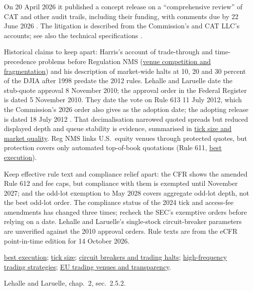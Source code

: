 \begin{qfrule}
On 20 April 2026 it published a concept release on a ``comprehensive review'' of CAT and other audit trails, including their funding, with comments due by 22 June 2026 \citep[91~FR 20945]{fr-2026-07651}. The litigation is described from the Commission's and CAT LLC's accounts; see also the technical specifications \citep[web page]{wide-sec-cat}.

 Historical claims to keep apart: Harris's account of trade-through and time-precedence problems before Regulation NMS (\hyperref[mech:venue-competition-fragmentation]{venue competition and fragmentation}) and his description of market-wide halts at 10, 20 and 30 percent of the DJIA after 1998 \citep[chap.~28, box, p.~573]{alpha-harris} predate the 2012 rules. Lehalle and Laruelle date the stub-quote approval 8 November 2010; the approval order in the Federal Register is dated 5 November 2010. They date the vote on Rule 613 11 July 2012, which the Commission's 2026 order also gives as the adoption date; the adopting release is dated 18 July 2012 \citep[sec.~II]{fr-2026-05350} \citep[n.~3]{fr-2026-00762}. That decimalisation narrowed quoted spreads but reduced displayed depth and queue stability is evidence, summarised in \hyperref[ev:tick-size-market-quality]{tick size and market quality}. Reg NMS links U.S.\ equity venues through protected quotes, but protection covers only automated top-of-book quotations (Rule 611, \hyperref[def:best-execution]{best execution}).

 Keep effective rule text and compliance relief apart: the CFR shows the amended Rule 612 and fee caps, but compliance with them is exempted until November 2027; and the odd-lot exemption to May 2028 covers aggregate odd-lot depth, not the best odd-lot order. The compliance status of the 2024 tick and access-fee amendments has changed three times; recheck the SEC's exemptive orders before relying on a date. Lehalle and Laruelle's single-stock circuit-breaker parameters are unverified against the 2010 approval orders. Rule texts are from the eCFR point-in-time edition for 14 October 2026.

 \hyperref[def:best-execution]{best execution}; \hyperref[def:tick-size]{tick size}; \hyperref[mech:circuit-breakers-trading-halts]{circuit breakers and trading halts}; \hyperref[def:hft-strategies]{high-frequency trading strategies}; \hyperref[rule:eu-trading-venue-transparency]{EU trading venues and transparency}.

 Lehalle and Laruelle, chap.~2, sec.~2.5.2.

\end{qfrule}

